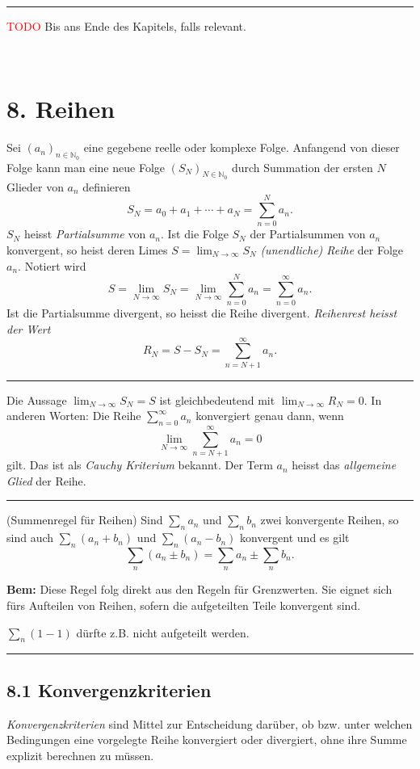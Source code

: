 \documentclass[a4paper,landscape,8pt]{extarticle}
\newcommand{\N}{\mathbb{N}}
\newcommand{\todo}{\textcolor{red}{TODO }}
\newcommand{\sep}{\vspace{5pt}\noindent\hrule\vspace{5pt}}
\newcommand{\Bem}{\textbf{Bem: }}
\renewcommand*{\newpage}{ \ }
\begin{document}
\begin{multicols*}{4}
\sep

\begin{warmup}
\todo Bis ans Ende des Kapitels, falls relevant.
\end{warmup}

\newpage

\section{8. Reihen}

Sei $(a_n)_{n\in \N_0}$ eine gegebene reelle oder komplexe Folge. Anfangend von
dieser Folge kann man eine neue Folge $(S_N)_{N\in \N_0}$ durch Summation der
ersten $N$ Glieder von $a_n$ definieren
\[
S_N = a_0 + a_1 + \cdots + a_N = \sum_{n=0}^{N}a_n.
\]
$S_N$ heisst \emph{Partialsumme} von $a_n$. Ist die Folge $S_N$ der
Partialsummen von $a_n$ konvergent, so heist deren Limes $S=\lim_{N\to
\infty}S_N$ \emph{(unendliche) Reihe} der Folge $a_n$. Notiert wird
\[
S = \lim_{N \to \infty} S_N = \lim_{N\to \infty} \sum_{n=0}^N a_n =
\sum_{n=0}^{\infty} a_n.
\]
Ist die Partialsumme divergent, so heisst die Reihe divergent. \emph{Reihenrest
heisst der Wert}
\[
R_N = S - S_N = \sum_{n=N+1}^\infty a_n.
\]

\sep

Die Aussage $\lim_{N\to \infty}S_N = S$ ist gleichbedeutend mit $\lim_{N\to
\infty}R_N = 0$. In anderen Worten: Die Reihe $\sum_{n=0}^\infty a_n$
konvergiert genau dann, wenn 
\[
\lim_{N\to\infty} \sum_{n=N+1}^\infty a_n = 0
\]
gilt. Das ist als \emph{Cauchy Kriterium} bekannt. Der Term $a_n$ heisst das
\emph{allgemeine Glied} der Reihe.

\sep

\Satz (Summenregel für Reihen) Sind $\sum_n a_n$ und $\sum_n b_n$ zwei
konvergente Reihen, so sind auch $\sum_n (a_n + b_n)$ und $\sum_n (a_n - b_n)$
konvergent und es gilt
\[
\sum_n (a_n \pm b_n) = \sum_n a_n \pm \sum_n b_n.
\]

\Bem Diese Regel folg direkt aus den Regeln für Grenzwerten. Sie eignet sich
fürs Aufteilen von Reihen, sofern die aufgeteilten Teile konvergent sind. 

\Bsp $\sum_n (1 - 1)$ dürfte z.B. nicht aufgeteilt werden.

\sep

\subsection{8.1 Konvergenzkriterien}

\emph{Konvergenzkriterien} sind Mittel zur Entscheidung darüber, ob
bzw. unter welchen Bedingungen eine vorgelegte Reihe konvergiert oder
divergiert, ohne ihre Summe explizit berechnen zu müssen.


\end{multicols*}
\end{document}
